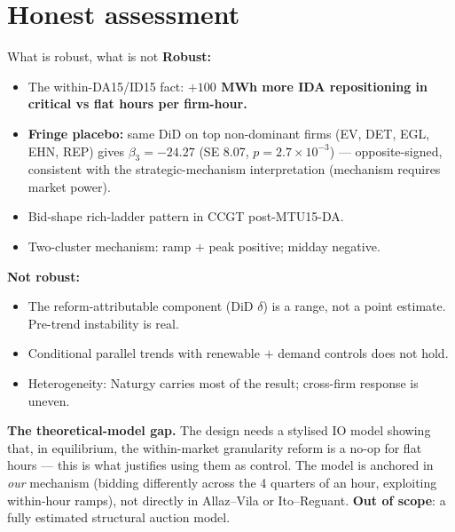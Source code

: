 \documentclass[10pt,aspectratio=169]{beamer}
\begin{document}
\section{Honest assessment}

\begin{frame}{What is robust, what is not}
  \footnotesize
  \textbf{Robust:}
  \begin{itemize}
    \item The within-DA15/ID15 fact: \textbf{$+100$ MWh more IDA repositioning in critical vs flat hours per firm-hour.}
    \item \textbf{Fringe placebo:} same DiD on top non-dominant firms (EV, DET, EGL, EHN, REP) gives $\beta_3 = -24.27$ (SE 8.07, $p = 2.7\!\times\!10^{-3}$) --- opposite-signed, consistent with the strategic-mechanism interpretation (mechanism requires market power).
    \item Bid-shape rich-ladder pattern in CCGT post-MTU15-DA.
    \item Two-cluster mechanism: ramp $+$ peak positive; midday negative.
  \end{itemize}
  \textbf{Not robust:}
  \begin{itemize}
    \item The reform-attributable component (DiD $\delta$) is a range, not a point estimate. Pre-trend instability is real.
    \item Conditional parallel trends with renewable $+$ demand controls does not hold.
    \item Heterogeneity: Naturgy carries most of the result; cross-firm response is uneven.
  \end{itemize}
  \textbf{The theoretical-model gap.} The design needs a stylised IO model showing that, in equilibrium, the within-market granularity reform is a no-op for flat hours --- this is what justifies using them as control. The model is anchored in \emph{our} mechanism (bidding differently across the 4 quarters of an hour, exploiting within-hour ramps), not directly in Allaz--Vila or Ito--Reguant. \textbf{Out of scope}: a fully estimated structural auction model.
\end{frame}
\end{document}
